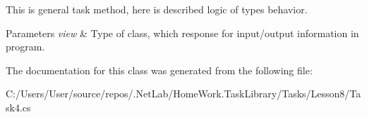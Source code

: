 This is general task method, here is described logic of types behavior. 


\begin{DoxyParams}{Parameters}
{\em view} & Type of class, which response for input/output information in program.\\
\hline
\end{DoxyParams}


The documentation for this class was generated from the following file\+:\begin{DoxyCompactItemize}
\item 
C\+:/\+Users/\+User/source/repos/.\+Net\+Lab/\+Home\+Work.\+Task\+Library/\+Tasks/\+Lesson8/Task4.\+cs\end{DoxyCompactItemize}
